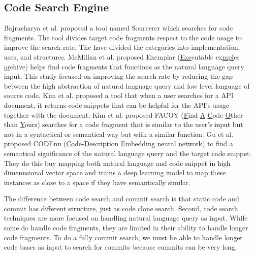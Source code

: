 \subsection{Code Search Engine}
Bajracharya et al. \cite{bajracharya2006sourcerer} proposed a tool named Sourcerer which searches for code fragments.
The tool divides target code fragments respect to the code usage to improve the search rate.
The have divided the categories into implementation, uses, and structures.
McMillan et al. \cite{mcmillan2011exemplar} proposed Exemplar (\underline{Exe}cutable ex\underline{mpl}es \underline{ar}chive) helps find code fragments that functions as the natural language query input.
This study focused on improving the search rate by reducing the gap between the high abstraction of natural language query and low level language of source code.
Kim et al. \cite{kim2010towards} proposed a tool that when a user searches for a API document, it returns code snippets that can be helpful for the API's usage together with the document.
Kim et al. \cite{kim2018facoy} proposed FACOY (\underline{F}ind \underline{A} \underline{C}ode \underline{O}ther than \underline{Y}ours) searches for a code fragment that is similar to the user's input but not in a syntactical or semantical way but with a similar function.
Gu et al. \cite{gu2018deep} proposed CODEnn (\underline{Co}de-\underline{D}escription \underline{E}mbedding \underline{n}eural \underline{n}etwork) to find a semantical significance of the natural language query and the target code snippet.
They do this buy mapping both natural language and code snippet in high dimennsional vector space and trains a deep learning model to map these instances as close to a space if they have semantically similar.

The difference between code search and commit search is that static code and commit has different structure, just as code clone search.
Second, code search techniques are more focused on handling natural language query as input.
While some do handle code fragments, they are limited in their ability to handle longer code fragments. 
To do a fully commit search, we must be able to handle longer code bases as input to search for commits because commits can be very long.

